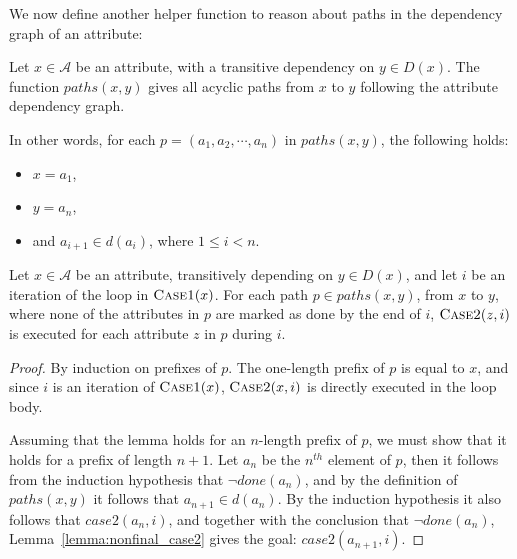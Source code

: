 {We now define another helper function to reason about paths in the dependency graph of
an attribute:

\begin{definition}
  Let $x \in \mathcal{A}$ be an attribute, with a transitive dependency on $y \in D(x)$.
  The function $\mathit{paths}(x, y)$ gives all acyclic paths from $x$ to $y$ following the
  attribute dependency graph.

  In other words, for each $p = (a_1, a_2, \cdots, a_n)$ in $\mathit{paths}(x, y)$, the following holds:
  \begin{itemize}
    \item $x = a_1$,
    \item $y = a_n$,
    \item and $a_{i+1} \in d(a_i)$, where $1 \le i < n$.
  \end{itemize}
\end{definition}

\newpage
\begin{lemma}
  Let $x \in \mathcal{A}$ be an attribute,
  transitively depending on $y \in D(x)$,
  and let $i$ be an iteration of the loop in $\textsc{Case1}(x)$.
  For each path $p \in \mathit{paths}(x, y)$, from $x$ to $y$,
  where none of the attributes in $p$ are marked as done by the end of $i$,
  $\textsc{Case2}(z, i)$ is executed for each attribute $z$ in $p$ during $i$.


  \label{path-lemma}
\end{lemma}

\begin{proof}
  By induction on prefixes of $p$.  The one-length prefix of $p$ is equal to $x$,
  and since $i$ is an iteration of $\textsc{Case1}(x)$,
  $\textsc{Case2}(x, i)$ is directly executed in the loop body.

  Assuming that the lemma holds for an $n$-length prefix of $p$, we must show that it holds
  for a prefix of length $n+1$. Let $a_n$ be the $n^{th}$ element of $p$, then
  it follows from the induction hypothesis that
  $\neg \mathit{done}(a_n)$, and by the definition of $\mathit{paths}(x, y)$
  it follows that $a_{n+1} \in d(a_n)$.
  By the induction hypothesis it also follows that $\mathit{case2}(a_n, i)$,
  and together with the conclusion that $\neg \mathit{done}(a_n)$,
  Lemma~\ref{lemma:nonfinal_case2} gives the goal: $\mathit{case2}(a_{n+1}, i)$.


\end{proof}}
